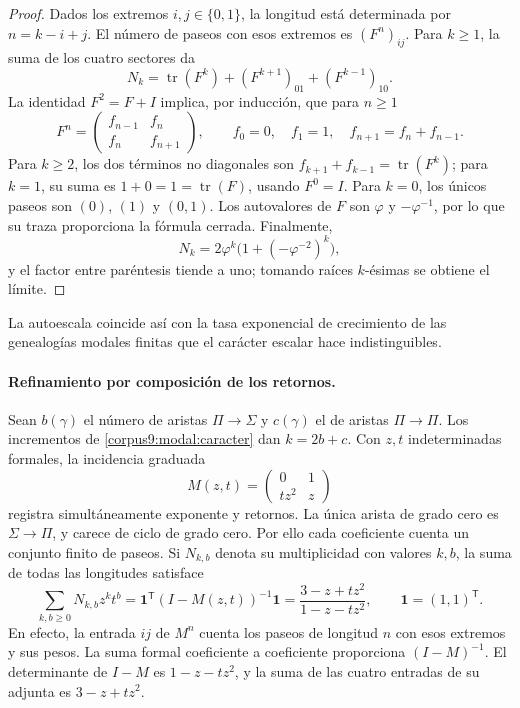 \begin{proof}
Dados los extremos \(i,j\in\{0,1\}\), la longitud está determinada
por \(n=k-i+j\). El número de paseos con esos extremos es
\((F^n)_{ij}\). Para \(k\geq1\), la suma de los cuatro sectores da
\[
 N_k=\operatorname{tr}(F^k)
      +(F^{k+1})_{01}+(F^{k-1})_{10}.
\]
La identidad \(F^2=F+I\) implica, por inducción, que para \(n\geq1\)
\[
 F^n=\begin{pmatrix}f_{n-1}&f_n\\f_n&f_{n+1}\end{pmatrix},
 \qquad f_0=0,\quad f_1=1,\quad f_{n+1}=f_n+f_{n-1}.
\]
Para \(k\geq2\), los dos términos no diagonales son
\(f_{k+1}+f_{k-1}=\operatorname{tr}(F^k)\); para \(k=1\),
su suma es \(1+0=1=\operatorname{tr}(F)\), usando \(F^0=I\).
Para \(k=0\), los únicos paseos son \((0)\), \((1)\) y \((0,1)\).
Los autovalores de \(F\) son \(\varphi\) y \(-\varphi^{-1}\),
por lo que su traza proporciona la fórmula cerrada.
Finalmente,
\[
 N_k=2\varphi^k\bigl(1+(-\varphi^{-2})^k\bigr),
\]
y el factor entre paréntesis tiende a uno; tomando raíces
\(k\)-ésimas se obtiene el límite.
\end{proof}

La autoescala coincide así con la tasa exponencial de crecimiento
de las genealogías modales finitas que el carácter escalar
hace indistinguibles.

\paragraph{Refinamiento por composición de los retornos.}
Sean \(b(\gamma)\) el número de aristas \(\Pi\to\Sigma\) y
\(c(\gamma)\) el de aristas \(\Pi\to\Pi\). Los incrementos de
\eqref{corpus9:modal:caracter} dan \(k=2b+c\).
Con \(z,t\) indeterminadas formales, la incidencia graduada
\[
 M(z,t)=\begin{pmatrix}0&1\\tz^2&z\end{pmatrix}
\]
registra simultáneamente exponente y retornos. La única arista
de grado cero es \(\Sigma\to\Pi\), y carece de ciclo de grado cero.
Por ello cada coeficiente cuenta un conjunto finito de paseos.
Si \(N_{k,b}\) denota su multiplicidad con valores \(k,b\), la suma
de todas las longitudes satisface
\begin{equation}
 \sum_{k,b\geq0}N_{k,b}z^kt^b
 =\mathbf1^{\mathsf T}(I-M(z,t))^{-1}\mathbf1
 =\frac{3-z+tz^2}{1-z-tz^2},
 \qquad \mathbf1=(1,1)^{\mathsf T}.
 \label{corpus9:modal:serie-graduada}
\end{equation}
En efecto, la entrada \(ij\) de \(M^n\) cuenta los paseos de
longitud \(n\) con esos extremos y sus pesos. La suma formal
coeficiente a coeficiente proporciona \((I-M)^{-1}\).
El determinante de \(I-M\) es \(1-z-tz^2\), y la suma de las
cuatro entradas de su adjunta es \(3-z+tz^2\).

